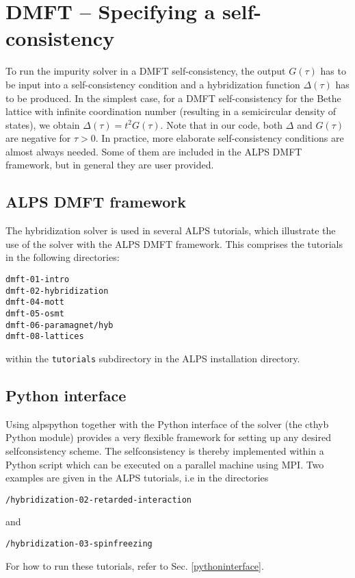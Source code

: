 \documentclass[aps,prb,floatfix,superscriptaddress,twocolumn,notitlepage]{revtex4-1}
\begin{document}
\section{DMFT -- Specifying a self-consistency}
To run the impurity solver in a DMFT self-consistency, the output $G(\tau)$ has to be input into a self-consistency condition and a hybridization function $\Delta(\tau)$ has to be produced.\cite{Georges96,Kotliar06} In the simplest case, for a DMFT self-consistency for the Bethe lattice with infinite coordination number (resulting in a semicircular density of states), we obtain $\Delta(\tau)=t^2G(\tau)$.
Note that in our code, both $\Delta$ and $G(\tau)$ are negative for $\tau>0$.
In practice, more elaborate self-consistency conditions are almost always needed. 
Some of them are included in the ALPS DMFT framework, but in general they are user provided.

\subsection{ALPS DMFT framework}

The hybridization solver is used in several ALPS tutorials, which illustrate the use of the solver with the ALPS DMFT framework. This comprises the tutorials in the following directories:
\begin{verbatim}
dmft-01-intro
dmft-02-hybridization
dmft-04-mott
dmft-05-osmt
dmft-06-paramagnet/hyb
dmft-08-lattices
\end{verbatim}
within the \verb#tutorials# subdirectory in the ALPS installation directory.

\subsection{Python interface}

Using alpspython together with the Python interface of the solver (the cthyb Python module) provides a very flexible framework for setting up any desired selfconsistency scheme.
The selfconsistency is thereby implemented within a Python script which can be executed on a parallel machine using MPI.
Two examples are given in the ALPS tutorials, i.e in the directories
\begin{verbatim}
/hybridization-02-retarded-interaction
\end{verbatim}
and
\begin{verbatim}
/hybridization-03-spinfreezing
\end{verbatim}
For how to run these tutorials, refer to Sec. \ref{pythoninterface}.
\end{document}
